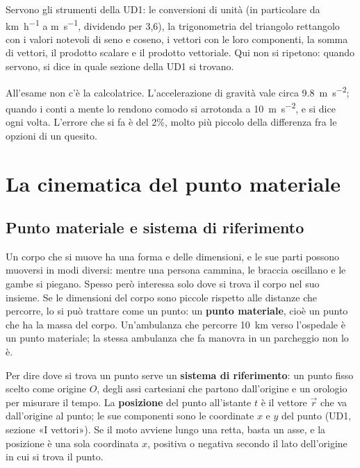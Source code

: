 Servono gli strumenti della UD1: le conversioni di unità (in particolare da \si{\kilo\metre\per\hour} a \si{\metre\per\second}, dividendo per 3,6), la trigonometria del triangolo rettangolo con i valori notevoli di seno e coseno, i vettori con le loro componenti, la somma di vettori, il prodotto scalare e il prodotto vettoriale. Qui non si ripetono: quando servono, si dice in quale sezione della UD1 si trovano.

All'esame non c'è la calcolatrice. L'accelerazione di gravità vale circa \SI{9,8}{\metre\per\second\squared}; quando i conti a mente lo rendono comodo si arrotonda a \SI{10}{\metre\per\second\squared}, e si dice ogni volta. L'errore che si fa è del 2\%, molto più piccolo della differenza fra le opzioni di un quesito.

\section{La cinematica del punto materiale}
\label{sec:ud2-cinematica}

\subsection{Punto materiale e sistema di riferimento}

Un corpo che si muove ha una forma e delle dimensioni, e le sue parti possono muoversi in modi diversi: mentre una persona cammina, le braccia oscillano e le gambe si piegano. Spesso però interessa solo dove si trova il corpo nel suo insieme. Se le dimensioni del corpo sono piccole rispetto alle distanze che percorre, lo si può trattare come un punto: un \textbf{punto materiale}, cioè un punto che ha la massa del corpo. Un'ambulanza che percorre \SI{10}{\kilo\metre} verso l'ospedale è un punto materiale; la stessa ambulanza che fa manovra in un parcheggio non lo è.

Per dire dove si trova un punto serve un \textbf{sistema di riferimento}: un punto fisso scelto come origine $O$, degli assi cartesiani che partono dall'origine e un orologio per misurare il tempo. La \textbf{posizione} del punto all'istante $t$ è il vettore $\vec r$ che va dall'origine al punto; le sue componenti sono le coordinate $x$ e $y$ del punto (UD1, sezione «I vettori»). Se il moto avviene lungo una retta, basta un asse, e la posizione è una sola coordinata $x$, positiva o negativa secondo il lato dell'origine in cui si trova il punto.

